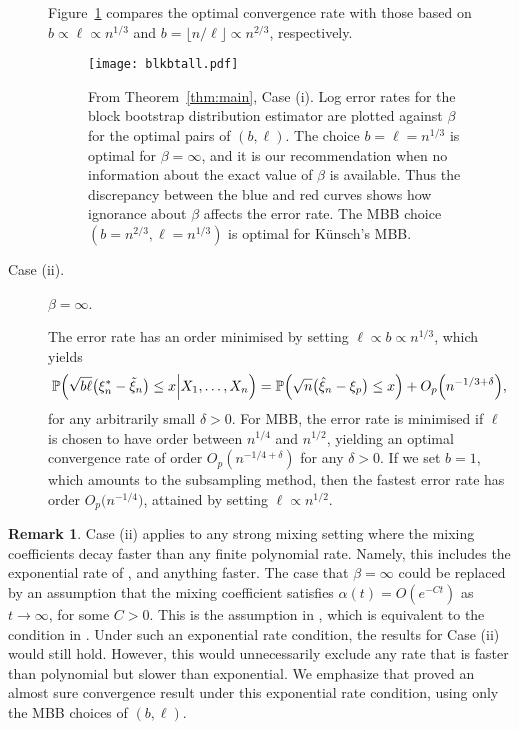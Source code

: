 \documentclass[a4paper, 12pt]{article}
\theoremstyle{plain}
\theoremstyle{definition}
\newcommand{\prob}{{\Bbb P}}
\newtheorem{remark}{Remark}
\begin{document}
\begin{description}
Figure~\ref{errorplot} compares the optimal convergence rate with those based on $b\propto\ell\propto n^{1/3}$ and
$b=\lfloor n/\ell\rfloor\propto n^{2/3}$, respectively.
\begin{figure}[htp]
\centering
\caption{\label{errorplot}
From Theorem~\ref{thm:main}, Case (i). Log error rates for the block bootstrap distribution estimator are plotted against $\beta$ for the optimal pairs of $(b,\ell)$. The choice $b=\ell=n^{1/3}$ is optimal for $\beta=\infty$, and it is our recommendation when no information about the exact value of $\beta$ is available. Thus the discrepancy between the blue and red curves shows how ignorance about $\beta$ affects the error rate. The MBB choice $(b=n^{2/3},\ell=n^{1/3})$ is optimal for K\"{u}nsch's MBB.}
\texttt{[image: blkbtall.pdf]}
\end{figure}
\item[Case (ii).] $\beta=\infty$.

The error rate has an order minimised by setting $\ell\propto b\propto n^{1/3}$, which yields
\[
\prob\Big(\sqrt{b\ell}\big(\xi^*_n-\tilde\xi_n\big)\le x
\Big|X_1,\ldots,X_n\Big)=\prob\Big(\sqrt{n}\big(\hat\xi_n-\xi_p\big)\le x\Big)
+O_p\Big(n^{-1/3+\delta}\Big),\]
for any arbitrarily small $\delta>0$.
For MBB, the error rate is minimised if $\ell$ is chosen to have order between $n^{1/4}$ and $n^{1/2}$, yielding an optimal convergence rate
of order $O_p\left(n^{-1/4+\delta}\right)$ for any $\delta>0$.
If we set $b=1$, which amounts to the subsampling method, then the fastest error rate has order $O_p\big(n^{-1/4}\big)$,
attained by setting $\ell\propto n^{1/2}$.

\end{description}

\begin{remark}
\label{remark:Sun}
Case (ii) applies to any strong mixing setting where the mixing coefficients decay faster than any finite polynomial rate. Namely, this includes the exponential rate of \citet{Sun:2007}, and anything faster. The case that $\beta=\infty$ could be replaced by an assumption that the mixing coefficient satisfies $\alpha(t)=O(e^{-Ct})$ as $t\rightarrow \infty$, for some $C>0$. This is the assumption in \cite{KLY:2017a}, which is equivalent to the condition in \citet{Sun:2007}. Under such an exponential rate condition, the results for Case (ii) would still hold. However, this would unnecessarily exclude any rate that is faster than polynomial but slower than exponential. We emphasize that \citet{Sun:2007} proved an almost sure convergence result under this exponential rate condition, using only the MBB choices of $(b,\ell)$.
\end{remark}
\end{document}
